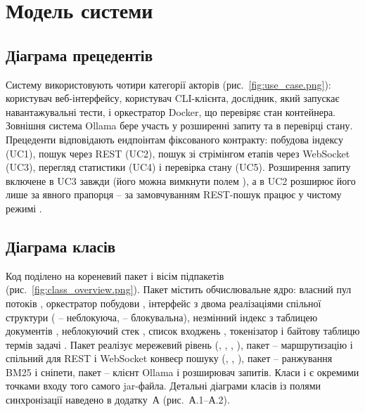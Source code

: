 \section{Модель системи}

\subsection{Діаграма прецедентів}

Систему використовують чотири категорії акторів (рис.~\ref{fig:use_case.png}): користувач
веб-інтерфейсу, користувач CLI-клієнта, дослідник, який запускає навантажувальні тести, і
оркестратор Docker, що перевіряє стан контейнера. Зовнішня система Ollama бере участь у
розширенні запиту та в перевірці стану. Прецеденти відповідають ендпоінтам фіксованого
контракту: побудова індексу (UC1), пошук через REST (UC2), пошук зі стрімінгом етапів через
WebSocket (UC3), перегляд статистики (UC4) і перевірка стану (UC5). Розширення запиту
включене в UC3 завжди (його можна вимкнути полем ), а в UC2 розширює
його лише за явного прапорця  -- за замовчуванням REST-пошук працює у
чистому режимі .


\subsection{Діаграма класів}

Код поділено на кореневий пакет і вісім підпакетів (рис.~\ref{fig:class_overview.png}). Пакет  містить
обчислювальне ядро: власний пул потоків , оркестратор побудови
, інтерфейс  з двома реалізаціями спільної структури
( -- неблокуюча,  -- блокувальна),
незмінний індекс  з таблицею документів ,
неблокуючий стек , список входжень , токенізатор і
байтову таблицю термів задачі . Пакет  реалізує мережевий
рівень (, , , ), пакет
 -- маршрутизацію і спільний для REST і WebSocket конвеєр пошуку
(, , ), пакет  --
ранжування BM25 і сніпети, пакет  -- клієнт Ollama і розширювач запитів. Класи
 і  є окремими точками входу того самого jar-файла. Детальні
діаграми класів із полями синхронізації наведено в додатку~А (рис.~А.1--А.2).

